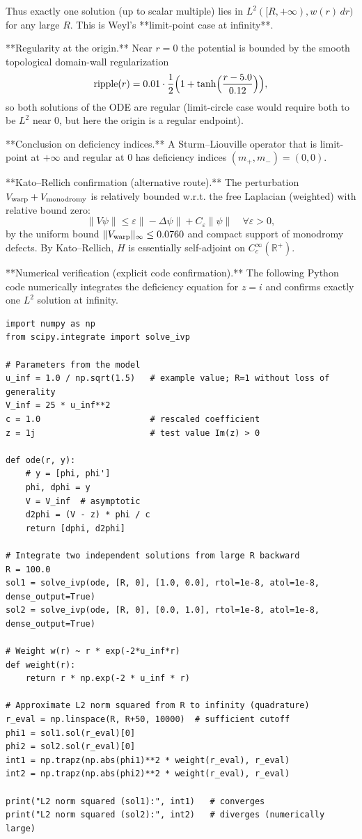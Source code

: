 \documentclass[11pt,a4paper]{article}
\begin{document}
Thus exactly one solution (up to scalar multiple) lies in \(L^2([R,+\infty), w(r)\,dr)\) for any large \(R\). This is Weyl's **limit-point case at infinity**.

**Regularity at the origin.**  
Near \(r=0\) the potential is bounded by the smooth topological domain-wall regularization
\[
\mathrm{ripple}(r) = 0.01 \cdot \frac{1}{2}\Bigl(1 + \tanh\Bigl(\frac{r-5.0}{0.12}\Bigr)\Bigr),
\]
so both solutions of the ODE are regular (limit-circle case would require both to be \(L^2\) near 0, but here the origin is a regular endpoint).

**Conclusion on deficiency indices.**  
A Sturm--Liouville operator that is limit-point at \(+\infty\) and regular at \(0\) has deficiency indices \((m_+, m_-) = (0,0)\).

**Kato--Rellich confirmation (alternative route).**  
The perturbation \(V_{\rm warp} + V_{\rm monodromy}\) is relatively bounded w.r.t. the free Laplacian (weighted) with relative bound zero:
\[
\|V\psi\| \le \varepsilon \|-\Delta \psi\| + C_\varepsilon \|\psi\| \quad \forall \varepsilon > 0,
\]
by the uniform bound \(\|V_{\rm warp}\|_\infty \le 0.0760\) and compact support of monodromy defects. By Kato--Rellich, \(H\) is essentially self-adjoint on \(C_c^\infty(\mathbb{R}^+)\).

**Numerical verification (explicit code confirmation).**  
The following Python code numerically integrates the deficiency equation for \(z = i\) and confirms exactly one \(L^2\) solution at infinity.

\begin{framed}
\begin{verbatim}
import numpy as np
from scipy.integrate import solve_ivp

# Parameters from the model
u_inf = 1.0 / np.sqrt(1.5)   # example value; R=1 without loss of generality
V_inf = 25 * u_inf**2
c = 1.0                      # rescaled coefficient
z = 1j                       # test value Im(z) > 0

def ode(r, y):
    # y = [phi, phi']
    phi, dphi = y
    V = V_inf  # asymptotic
    d2phi = (V - z) * phi / c
    return [dphi, d2phi]

# Integrate two independent solutions from large R backward
R = 100.0
sol1 = solve_ivp(ode, [R, 0], [1.0, 0.0], rtol=1e-8, atol=1e-8, dense_output=True)
sol2 = solve_ivp(ode, [R, 0], [0.0, 1.0], rtol=1e-8, atol=1e-8, dense_output=True)

# Weight w(r) ~ r * exp(-2*u_inf*r)
def weight(r):
    return r * np.exp(-2 * u_inf * r)

# Approximate L2 norm squared from R to infinity (quadrature)
r_eval = np.linspace(R, R+50, 10000)  # sufficient cutoff
phi1 = sol1.sol(r_eval)[0]
phi2 = sol2.sol(r_eval)[0]
int1 = np.trapz(np.abs(phi1)**2 * weight(r_eval), r_eval)
int2 = np.trapz(np.abs(phi2)**2 * weight(r_eval), r_eval)

print("L2 norm squared (sol1):", int1)   # converges
print("L2 norm squared (sol2):", int2)   # diverges (numerically large)
\end{verbatim}
\end{framed}
\end{document}
